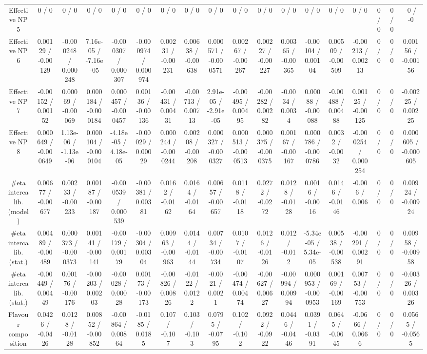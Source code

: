 \documentclass[10pt]{article}
\begin{document}
\begin{table}[htbp]
\begin{center}
\begin{tabular}{|c|c|c|c|c|c|c|c|c|c|c|c|c|c|c|c|c|c|}
  Effective NP 5 & 0 / 0 & 0 / 0 & 0 / 0 & 0 / 0 & 0 / 0 & 0 / 0 & 0 / 0 & 0 / 0 & 0 / 0 & 0 / 0 & 0 / 0 & 0 / 0 & 0 / 0 & 0 / 0 & 0 / 0 & 0 / 0 & -0 / -0 \\ 
  Effective NP 6 & 0.00129 / -0.00129 & -0.000248 / 0.000248 & 7.16e-05 / -7.16e-05 & -0.000307 / 0.000307 & -0.000974 / 0.000974 & 0.00231 / -0.00231 & 0.00638 / -0.00638 & 0.000571 / -0.000571 & 0.00267 / -0.00267 & 0.00227 / -0.00227 & 0.00365 / -0.00365 & -0.00104 / 0.00104 & 0.00509 / -0.00509 & -0.00213 / 0.00213 & 0 / 0 & 0 / 0 & 0.00156 / -0.00156 \\ 
  Effective NP 7 & -0.00152 / 0.00152 & 0.00069 / -0.00069 & 0.000184 / -0.000184 & 0.000457 / -0.000457 & 0.00136 / -0.00136 & -0.00431 / 0.00431 & -0.00713 / 0.00713 & 2.91e-05 / -2.91e-05 & -0.00495 / 0.00495 & -0.00282 / 0.00282 & -0.0034 / 0.0034 & 0.00088 / -0.00088 & -0.00488 / 0.00488 & 0.00125 / -0.00125 & 0 / 0 & 0 / 0 & -0.00225 / 0.00225 \\ 
  Effective NP 8 & 0.000649 / -0.000649 & 1.13e-06 / -1.13e-06 & 0.000104 / -0.000104 & -4.18e-05 / 4.18e-05 & -0.00029 / 0.00029 & 0.000244 / -0.000244 & 0.00208 / -0.00208 & 0.000327 / -0.000327 & 0.000513 / -0.000513 & 0.000375 / -0.000375 & 0.00167 / -0.00167 & 0.000786 / -0.000786 & 0.0032 / -0.0032 & -0.000254 / 0.000254 & 0 / 0 & 0 / 0 & 0.000605 / -0.000605 \\ 
  #eta intercalib. (model) & 0.00677 / -0.00677 & 0.00233 / -0.00233 & 0.00187 / -0.00187 & -0.000539 / 0.000539 & -0.00381 / 0.00381 & 0.0162 / -0.0162 & 0.0164 / -0.0164 & 0.00657 / -0.00657 & 0.0118 / -0.0118 & 0.0272 / -0.0272 & 0.0128 / -0.0128 & 0.0016 / -0.0016 & 0.0146 / -0.0146 & -0.006 / 0.006 & 0 / 0 & 0 / 0 & 0.00924 / -0.00924 \\ 
  #eta intercalib. (stat.) & 0.00489 / -0.00489 & 0.000373 / -0.000373 & 0.00141 / -0.00141 & -0.00179 / 0.00179 & -0.00304 / 0.00304 & 0.00963 / -0.00963 & 0.0144 / -0.0144 & 0.00734 / -0.00734 & 0.0107 / -0.0107 & 0.0126 / -0.0126 & 0.012 / -0.012 & -5.34e-05 / 5.34e-05 & 0.00538 / -0.00538 & -0.00291 / 0.00291 & 0 / 0 & 0 / 0 & 0.00958 / -0.00958 \\ 
  #eta intercalib. (stat.) & -0.00449 / 0.00449 & 0.00176 / -0.00176 & -0.00203 / 0.00203 & -0.00028 / 0.00028 & 0.00173 / -0.00173 & -0.00826 / 0.00826 & -0.0122 / 0.0122 & -0.0021 / 0.0021 & -0.00474 / 0.00474 & -0.00627 / 0.00627 & -0.00994 / 0.00994 & 0.000953 / -0.000953 & 0.00169 / -0.00169 & 0.00753 / -0.00753 & 0 / 0 & 0 / 0 & -0.00326 / 0.00326 \\ 
  Flavour composition & 0.0426 / -0.0426 & 0.0128 / -0.0128 & 0.00852 / -0.00852 & -0.00864 / 0.00864 & -0.0185 / 0.0185 & 0.107 / -0.107 & 0.103 / -0.103 & 0.0795 / -0.0795 & 0.102 / -0.102 & 0.0922 / -0.0922 & 0.0446 / -0.0446 & 0.0391 / -0.0391 & 0.0645 / -0.0645 & -0.0666 / 0.0666 & 0 / 0 & 0 / 0 & 0.0565 / -0.0565 \\ 

\end{tabular}
\end{center}
\end{table}
\end{document}

